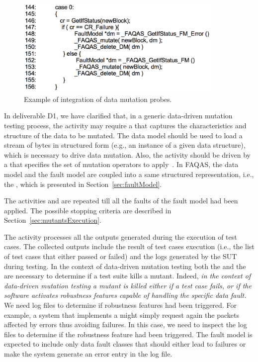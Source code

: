 \begin{figure}
	\centering
		\includegraphics[width=10cm]{images/dataMutationProbes}
		\caption{Example of integration of data mutation probes.}
		\label{fig:data:mutationProbes}
	\end{figure}


	
In deliverable D1, we have clarified that, in a generic data-driven mutation testing process, the activity  may require a  that captures the characteristics and structure of the data to be mutated. 
The data model should be used to load a stream of bytes in structured form (e.g., an instance of a given data structure), which is necessary to drive data mutation. 
Also, the activity  should be driven by a  that specifies the set of mutation operators to apply~\cite{di2015generating}. 
In FAQAS, the data model and the fault model are coupled into a same structured representation, i.e., the , which is presented in Section~\ref{sec:faultModel}.


The activities  and  are repeated till all the faults of the fault model had been applied. The possible stopping criteria are described in Section~\ref{sec:mutantsExecution}. 

The activity  processes all the outputs generated during the execution of test cases.
The collected outputs include the result of test cases execution (i.e., the list of test cases that either passed or failed) and the logs generated by the SUT during testing.
In the context of data-driven mutation testing both the  and the  are necessary to determine if a test suite kills a mutant.
Indeed, \emph{in the context of data-driven mutation testing a mutant is killed either if a test case fails, or if the software activates robustness features capable of handling the specific data fault.}
We need log files to determine if robustness features had been triggered.
For example, a system that implements a  might simply request again the packets affected by errors thus avoiding failures. In this case, we need to inspect the log files to determine if the robustness feature had been triggered.
The fault model is expected to include only data fault classes that should either lead to failures or make the system generate an error entry in the log file.

